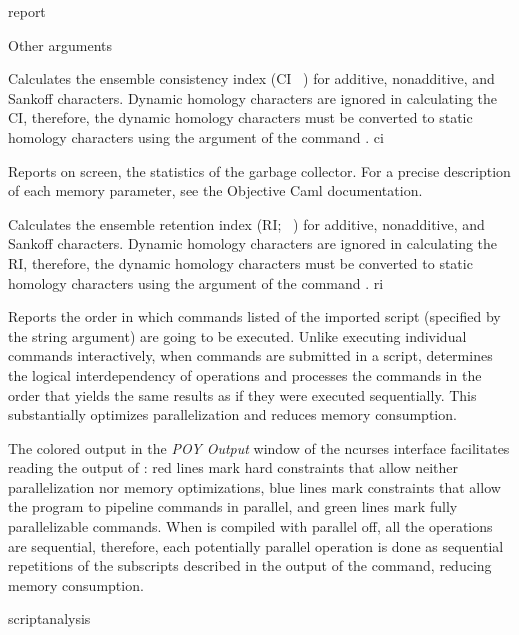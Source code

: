 \begin{command}{report}{}
\begin{arguments}
		\begin{argumentgroup}{Other arguments}
			{} 

	      {Calculates the ensemble consistency index (CI ~\cite{farris1989,
	      klugeandfarris1969}) for additive, nonadditive, and Sankoff
	      characters. Dynamic homology characters are ignored in calculating
	      the CI, therefore, the dynamic homology characters must be converted
	      to static homology characters using the argument  
	      of the command .}
	      {ci}
	      
                {Reports on screen, the statistics of
                the garbage collector. For a precise description of each memory parameter, see
                the Objective Caml documentation.}
                {}
	     
	      {Calculates the ensemble retention index (RI; ~\cite{farris1989}) for additive,
	      nonadditive, and Sankoff characters. Dynamic homology characters are ignored in calculating
	      the RI, therefore, the dynamic homology characters must be converted
	      to static homology characters using the argument  
	      of the command .}
	      {ri}
	      
                {Reports the order in which commands listed of the imported
                script (specified by the string argument) are going to be executed.
                Unlike executing individual commands interactively, when commands are submitted in a 
                script, \poy determines the logical interdependency of operations
                and processes the commands in the order that yields the same
                results as if they were executed sequentially. This substantially
                optimizes parallelization and reduces memory consumption.
                
                The colored output in the \emph{POY Output} window of the ncurses
                interface facilitates reading the output of :
                red lines mark hard constraints that allow neither
                parallelization nor memory optimizations, blue lines mark 
                constraints that allow the program to pipeline commands in
                parallel, and green lines mark fully parallelizable commands. When \poy
                is compiled with parallel off, all the operations are
                sequential, therefore, each potentially parallel operation is
                done as sequential repetitions of the subscripts described in
                the output of the command, reducing memory consumption.}
                {scriptanalysis}
                

\end{argumentgroup}
\end{arguments}
\end{command}
